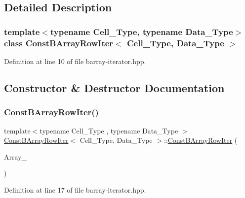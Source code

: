 \subsection{Detailed Description}
\subsubsection*{template$<$typename Cell\+\_\+\+Type, typename Data\+\_\+\+Type$>$\newline
class Const\+B\+Array\+Row\+Iter$<$ Cell\+\_\+\+Type, Data\+\_\+\+Type $>$}



Definition at line 10 of file barray-\/iterator.\+hpp.



\subsection{Constructor \& Destructor Documentation}
\mbox{\label{class_const_b_array_row_iter_aa7eb0016052539d179dfe3fc82732f2e}} 
\subsubsection{\texorpdfstring{Const\+B\+Array\+Row\+Iter()}{ConstBArrayRowIter()}}
{\footnotesize\ttfamily template$<$typename Cell\+\_\+\+Type , typename Data\+\_\+\+Type $>$ \\
\hyperlink{class_const_b_array_row_iter}{Const\+B\+Array\+Row\+Iter}$<$ Cell\+\_\+\+Type, Data\+\_\+\+Type $>$\+::\hyperlink{class_const_b_array_row_iter}{Const\+B\+Array\+Row\+Iter} (\begin{DoxyParamCaption}\item[{const \hyperlink{class_b_array}{B\+Array}$<$ Cell\+\_\+\+Type, Data\+\_\+\+Type $>$ $\ast$}]{Array\+\_\+ }\end{DoxyParamCaption})\hspace{0.3cm}{\ttfamily [inline]}}



Definition at line 17 of file barray-\/iterator.\+hpp.

\mbox{\label{class_const_b_array_row_iter_a5f32704679331be41e994d37294e3476}} 
